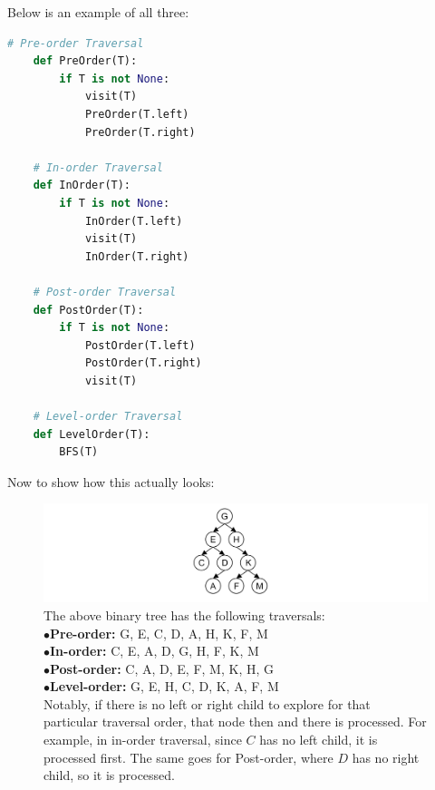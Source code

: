 \noindent
Below is an example of all three:

\begin{Example}

    \begin{lstlisting}[language=Python, numbers=none]
    # Pre-order Traversal
    def PreOrder(T):
        if T is not None:
            visit(T)
            PreOrder(T.left)
            PreOrder(T.right)

    # In-order Traversal
    def InOrder(T):
        if T is not None:
            InOrder(T.left)
            visit(T)
            InOrder(T.right)

    # Post-order Traversal
    def PostOrder(T):
        if T is not None:
            PostOrder(T.left)
            PostOrder(T.right)
            visit(T)

    # Level-order Traversal
    def LevelOrder(T):
        BFS(T)
    \end{lstlisting}
\end{Example}

\newpage

\noindent
Now to show how this actually looks:
\begin{figure}[h]


    \hspace {-10em} \includegraphics[width=1.5\textwidth]{./Sections/graphs/binary_tree_traversals.png}
  
     \caption{%
        The above binary tree has the following traversals:\\[1em]
           $\bullet$\quad  \textbf{Pre-order:}  \hspace{.5em} G, E, C, D, A, H, K, F, M\\
           $\bullet$\quad  \textbf{In-order:}   \hspace{1.2em} C, E, A, D, G, H, F, K, M\\
           $\bullet$\quad  \textbf{Post-order:} \hspace{.05em} C, A, D, E, F, M, K, H, G\\
           $\bullet$\quad \textbf{Level-order:} G, E, H, C, D, K, A, F, M\\[1em]
         Notably, if there is no left or right child to explore for that particular traversal order, that node then and there is processed.
     For example, in in-order traversal, since $C$ has no left child, it is processed first. The same goes for Post-order, where $D$ has no right child, so it is processed.
     }\label{fig:binary_tree_traversals}
  \end{figure}
\newpage

